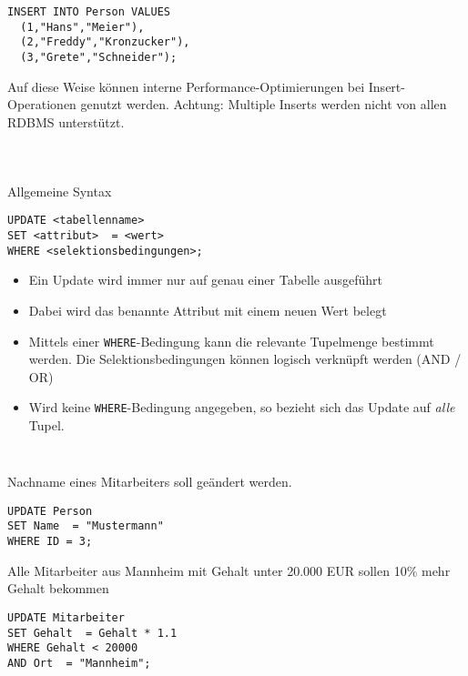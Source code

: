 \begin{frame}[fragile]\frametitle{\insertsection}
	\framesubtitle{\insertsubsection}
	\abs
	\begin{lstlisting}[xleftmargin=3ex]
INSERT INTO Person VALUES
  (1,"Hans","Meier"),
  (2,"Freddy","Kronzucker"),
  (3,"Grete","Schneider");
\end{lstlisting}
\abs
Auf diese Weise können interne Performance-Optimierungen bei Insert-Operationen genutzt werden.
\abs
\alert{Achtung: Multiple Inserts werden nicht von allen RDBMS unterstützt.}
\end{frame}

\begin{frame}[fragile]
\frametitle{\insertsection}
\framesubtitle{\insertsubsection}
\onslide
{}\\[4pt]
\begin{block}{Allgemeine Syntax}
	\begin{lstlisting}[xleftmargin=3ex]
UPDATE <tabellenname>
SET <attribut>  = <wert>
WHERE <selektionsbedingungen>;
		\end{lstlisting}
	\end{block}
\pause
\begin{itemize}
	\item Ein Update wird immer nur auf genau einer Tabelle ausgeführt
	\item Dabei wird das benannte Attribut mit einem neuen Wert belegt
	\item Mittels einer \texttt{WHERE}-Bedingung kann die relevante Tupelmenge bestimmt werden. Die Selektionsbedingungen können logisch verknüpft werden (AND / OR)
	\item Wird keine \texttt{WHERE}-Bedingung angegeben, so bezieht sich das Update auf \textit{alle} Tupel.
\end{itemize}
\end{frame}

\begin{frame}[fragile]\frametitle{\insertsection}
	\framesubtitle{\insertsubsection}
	\\[4pt]
Nachname eines Mitarbeiters soll geändert werden.
	\begin{lstlisting}[xleftmargin=3ex]
UPDATE Person
SET Name  = "Mustermann"
WHERE ID = 3;
		\end{lstlisting}
\abs
Alle Mitarbeiter aus Mannheim mit Gehalt unter 20.000 EUR sollen 10\% mehr Gehalt bekommen
	\begin{lstlisting}[xleftmargin=3ex]
UPDATE Mitarbeiter
SET Gehalt  = Gehalt * 1.1
WHERE Gehalt < 20000
AND Ort  = "Mannheim";
		\end{lstlisting}
\end{frame}

